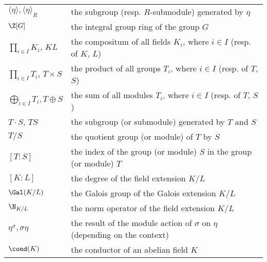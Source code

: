 \begin{longtable}[l]{ll}
  $\langle \eta \rangle, \langle \eta \rangle_{R}$ & the subgroup (resp. $R$-submodule) generated by $\eta$ \\[1mm]
  $\Z[G]$					& the integral group ring of the group $G$ \\[1mm]
  $\prod_{i\in I}K_i$, $KL$                 & the compositum of all fields $K_i$, where $i\in I$ (resp. of $K$, $L$)\\[1mm]
  $\prod_{i\in I}T_i$, $T\times S$                 & the product of all groups $T_i$, where $i\in I$ (resp. of $\!T\!$, $\!S$)\\[1mm]
    $\bigoplus_{i\in I}T_i, T\oplus S$                 & the sum of all modules $T_i$, where $i\in I$ (resp. of $T$, $S$)\\[1mm]
    $T\cdot S$, $TS$                 & the subgroup (or submodule) generated by $T$ and $S$ \\[1mm]
  $T/S$          & the quotient group (or module) of $T$ by $S$ \\[1mm]
  $[T:S]$				    & the index of the group (or module) $S$ in the group (or module) $T$ \\[1mm]
  $[K:L]$				& the degree of the field extension $K/L$ \\[1mm]
  $\Gal(K/L)$         & the Galois group of the Galois extension $K/L$ \\[1mm]
  $\N_{K/L}$         & the norm operator of the field extension $K/L$ \\[1mm]
  $\eta^{\sigma}, \sigma \eta$ & the result of the module action of $\sigma$ on $\eta$ (depending on the context)\\[1mm]
  $\cond(K)$			& the conductor of an abelian field $K$
\end{longtable}
